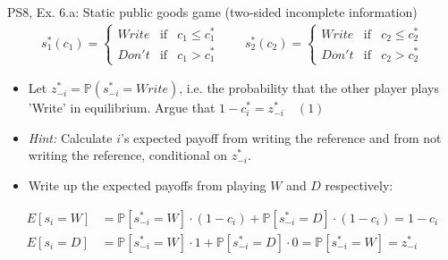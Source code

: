 \begin{frame}{PS8, Ex. 6.a: Static public goods game (two-sided incomplete information)}
    \begin{align*}
      s_1^*(c_1)=\left\{\begin{array}{rcl}
        Write & \text{if} & c_1\leq c_1^*\\
        Don't & \text{if} & c_1>c_1^*
        \end{array}\right.\quad\quad
      s_2^*(c_2)=\left\{\begin{array}{rcl}
        Write & \text{if} & c_2\leq c_2^*\\
        Don't & \text{if} & c_2>c_2^*
        \end{array}\right.
    \end{align*}
    \vspace{-12pt}
    \begin{itemize}
      \item[(a)] Let $z_{-i}^* = \mathbb{P}(s_{-i}^*=Write)$, i.e. the probability that the other player plays 'Write' in equilibrium. Argue that $1-c_i^*=z_{-i}^*\quad(1)$
      \item[] \textit{Hint:} Calculate $i$'s expected payoff from writing the reference and from not writing the reference, conditional on $z_{-i}^*$.
    \end{itemize}
    \vspace{-8pt}
    \begin{itemize}
      \item[Step 1:] Write up the expected payoffs from playing $W$ and $D$ respectively:
    \end{itemize}
    \vspace{-8pt}
    \begin{align*}
      E[s_i=W]&=\mathbb{P}\left[s_{-i}^*=W\right]\cdot(1-c_i)+\mathbb{P}\left[s_{-i}^*=D\right]\cdot(1-c_i)=1-c_i\\
      E[s_i=D]&=\mathbb{P}\left[s_{-i}^*=W\right]\cdot1+\mathbb{P}\left[s_{-i}^*=D\right]\cdot0=\mathbb{P}\left[s_{-i}^*=W\right]=z_{-i}^*
    \end{align*}
    \vfill\null
\end{frame}
